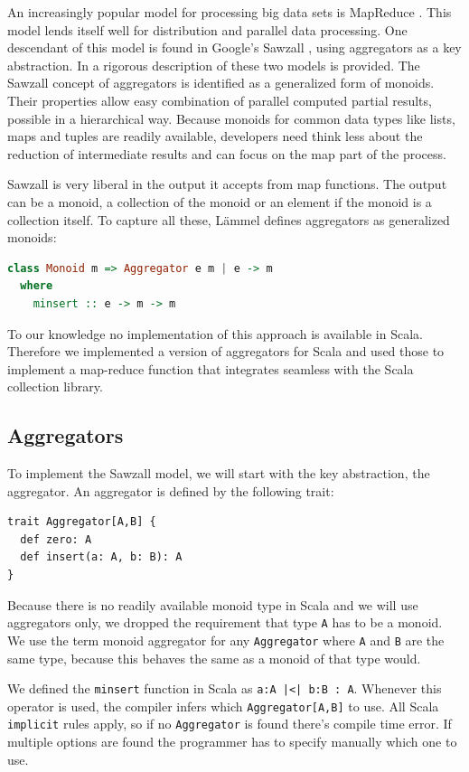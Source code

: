 \documentclass[10pt,a4paper]{article}
\begin{document}
An increasingly popular model for processing big data sets is MapReduce \citep{dean2008mapreduce}. This model lends itself well for distribution and parallel data processing. One descendant of this model is found in Google's Sawzall \citep{pike2005interpreting}, using aggregators as a key abstraction. In \cite{lammel2008google} a rigorous description of these two models is provided. The Sawzall concept of aggregators is identified as a generalized form of monoids. Their properties allow easy combination of parallel computed partial results, possible in a hierarchical way. Because monoids for common data types like lists, maps and tuples are readily available, developers need think less about the reduction of intermediate results and can focus on the map part of the process.

Sawzall is very liberal in the output it accepts from map functions. The output can be a monoid, a collection of the monoid or an element if the monoid is a collection itself. To capture all these, L\"ammel defines aggregators as generalized monoids:
\begin{lstlisting}[language=haskell]
class Monoid m => Aggregator e m | e -> m
  where
    minsert :: e -> m -> m
\end{lstlisting}

To our knowledge no implementation of this approach is available in Scala. Therefore we implemented a version of aggregators for Scala and used those to implement a map-reduce function that integrates seamless with the Scala collection library.

\subsection{Aggregators}

To implement the Sawzall model, we will start with the key abstraction, the aggregator. An aggregator is defined by the following trait:
\begin{lstlisting}
trait Aggregator[A,B] {
  def zero: A
  def insert(a: A, b: B): A
}
\end{lstlisting}
Because there is no readily available monoid type in Scala and we will use aggregators only, we dropped the requirement that type \lstinline|A| has to be a monoid. We use the term monoid aggregator for any \lstinline|Aggregator| where \lstinline|A| and \lstinline|B| are the same type, because this behaves the same as a monoid of that type would.

We defined the \lstinline[language=haskell]|minsert| function in Scala as \lstinline!a:A |<| b:B : A!. Whenever this operator is used, the compiler infers which \lstinline|Aggregator[A,B]| to use. All Scala \lstinline|implicit| rules apply, so if no \lstinline|Aggregator| is found there's compile time error. If multiple options are found the programmer has to specify manually which one to use.
\end{document}
